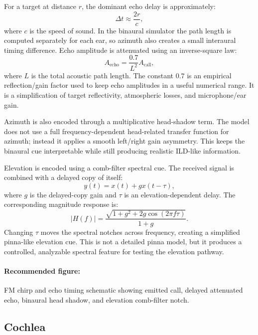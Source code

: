 For a target at distance $r$, the dominant echo delay is approximately:
\begin{equation}
    \Delta t \approx \frac{2r}{c},
\end{equation}
where $c$ is the speed of sound. In the binaural simulator the path length is computed separately for each ear, so azimuth also creates a small interaural timing difference. Echo amplitude is attenuated using an inverse-square law:
\begin{equation}
    A_{\text{echo}} = \frac{0.7}{L^2}A_{\text{call}},
\end{equation}
where $L$ is the total acoustic path length. The constant $0.7$ is an empirical reflection/gain factor used to keep echo amplitudes in a useful numerical range. It is a simplification of target reflectivity, atmospheric losses, and microphone/ear gain.

Azimuth is also encoded through a multiplicative head-shadow term. The model does not use a full frequency-dependent head-related transfer function for azimuth; instead it applies a smooth left/right gain asymmetry. This keeps the binaural cue interpretable while still producing realistic ILD-like information.

Elevation is encoded using a comb-filter spectral cue. The received signal is combined with a delayed copy of itself:
\begin{equation}
    y(t)=x(t)+g x(t-\tau),
\end{equation}
where $g$ is the delayed-copy gain and $\tau$ is an elevation-dependent delay. The corresponding magnitude response is:
\begin{equation}
    |H(f)| = \frac{\sqrt{1+g^2+2g\cos(2\pi f \tau)}}{1+g}.
\end{equation}
Changing $\tau$ moves the spectral notches across frequency, creating a simplified pinna-like elevation cue. This is not a detailed pinna model, but it produces a controlled, analyzable spectral feature for testing the elevation pathway.

\paragraph{Recommended figure:} FM chirp and echo timing schematic showing emitted call, delayed attenuated echo, binaural head shadow, and elevation comb-filter notch.

\subsection{Cochlea}



